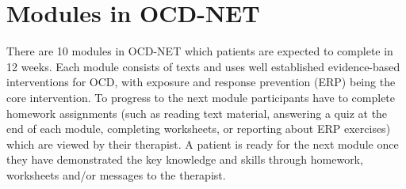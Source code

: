 \documentclass[]{book}
\begin{document}
\hypertarget{modules-in-ocd-net}{%
\section{Modules in OCD-NET}\label{modules-in-ocd-net}}

There are 10 modules in OCD-NET which patients are expected to complete in 12 weeks. Each module consists of texts and uses well established evidence-based interventions for OCD, with exposure and response prevention (ERP) being the core intervention. To progress to the next module participants have to complete homework assignments (such as reading text material, answering a quiz at the end of each module, completing worksheets, or reporting about ERP exercises) which are viewed by their therapist. A patient is ready for the next module once they have demonstrated the key knowledge and skills through homework, worksheets and/or messages to the therapist.
\end{document}
